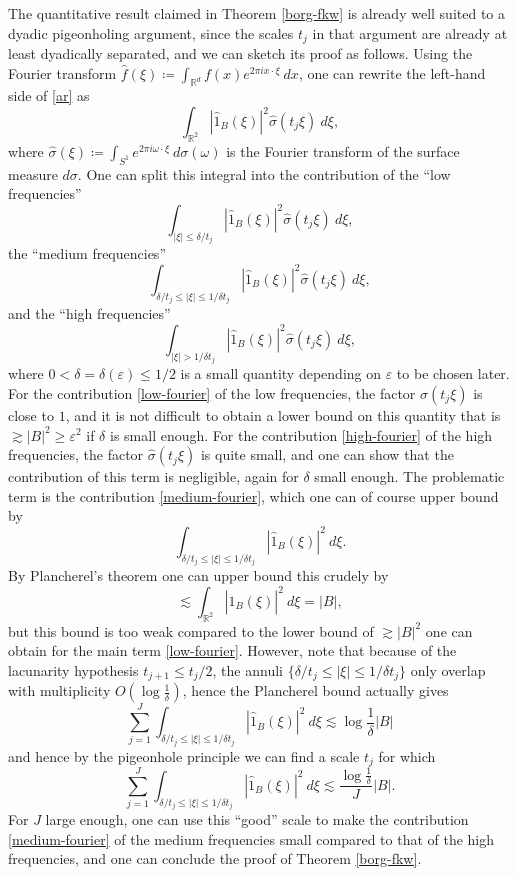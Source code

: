 \documentclass[12pt,a4paper,reqno]{amsart}
\numberwithin{equation}{section}
\theoremstyle{plain}
\theoremstyle{definition}
\newcommand\R{\mathbb{R}}
\newcommand\eps{\varepsilon}
\begin{document}
The quantitative result claimed in Theorem \ref{borg-fkw} is already well suited to a dyadic pigeonholing argument, since the scales $t_j$ in that argument are already at least dyadically separated, and we can sketch its proof as follows.  Using the Fourier transform $\hat f(\xi) \coloneqq \int_{\R^d} f(x) e^{2\pi i x \cdot \xi}\ dx$, one can rewrite the left-hand side of \eqref{ar} as
$$ \int_{\R^2} |\hat 1_B(\xi)|^2 \hat \sigma( t_j \xi)\ d\xi,$$
where $\hat \sigma(\xi) \coloneqq \int_{S^1} e^{2\pi i \omega \cdot \xi}\ d\sigma(\omega)$ is the Fourier transform of the surface measure $d\sigma$.  One can split this integral into the contribution of the ``low frequencies''
\begin{equation}\label{low-fourier}
\int_{|\xi| \leq \delta / t_j} |\hat 1_B(\xi)|^2 \hat \sigma( t_j \xi)\ d\xi,
\end{equation}
the ``medium frequencies''
\begin{equation}\label{medium-fourier}
\int_{\delta/t_j \leq |\xi| \leq 1 / \delta t_j} |\hat 1_B(\xi)|^2 \hat \sigma( t_j \xi)\ d\xi,
\end{equation}
and the ``high frequencies''
\begin{equation}\label{high-fourier}
\int_{|\xi| > 1 / \delta t_j} |\hat 1_B(\xi)|^2 \hat \sigma( t_j \xi)\ d\xi,
\end{equation}
where $0 < \delta = \delta(\eps) \leq 1/2$ is a small quantity depending on $\eps$ to be chosen later.
For the contribution \eqref{low-fourier} of the low frequencies, the factor $\hat \sigma(t_j \xi)$ is close to $1$, and it is not difficult to obtain a lower bound on this quantity that is $\gtrsim |B|^2 \geq \eps^2$ if $\delta$ is small enough.  For the contribution \eqref{high-fourier} of the high frequencies, the factor $\hat \sigma(t_j \xi)$ is quite small, and one can show that the contribution of this term is negligible, again for $\delta$ small enough.  The problematic term is the contribution \eqref{medium-fourier}, which one can of course upper bound by
$$ \int_{\delta/t_j \leq |\xi| \leq 1 / \delta t_j} |\hat 1_B(\xi)|^2\ d\xi.$$
By Plancherel's theorem one can upper bound this crudely by
$$ \lesssim \int_{\R^2} |\hat 1_B(\xi)|^2\ d\xi = |B|,$$
but this bound is too weak compared to the lower bound of $\gtrsim |B|^2$ one can obtain for the main term \eqref{low-fourier}.  However, note that because of the lacunarity hypothesis $t_{j+1} \leq t_j/2$, the annuli $\{ \delta/t_j \leq |\xi| \leq 1 / \delta t_j\}$ only overlap with multiplicity $O(\log \frac{1}{\delta})$, hence the Plancherel bound actually gives
\begin{equation}\label{sumj}
 \sum_{j=1}^J \int_{\delta/t_j \leq |\xi| \leq 1 / \delta t_j} |\hat 1_B(\xi)|^2\ d\xi \lesssim \log \frac{1}{\delta} |B|
\end{equation}
and hence by the pigeonhole principle we can find a scale $t_j$ for which
$$ \sum_{j=1}^J \int_{\delta/t_j \leq |\xi| \leq 1 / \delta t_j} |\hat 1_B(\xi)|^2\ d\xi \lesssim \frac{\log \frac{1}{\delta}}{J} |B|.$$
For $J$ large enough, one can use this ``good'' scale to make the contribution \eqref{medium-fourier} of the medium frequencies small compared to that of the high frequencies, and one can conclude the proof of Theorem \ref{borg-fkw}.
\end{document}
